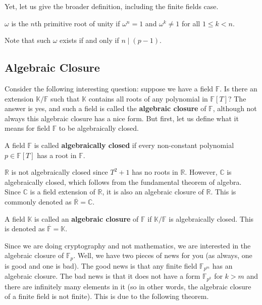 \documentclass[../../book.tex]{subfiles}
\begin{document}
Yet, let us give the broader definition, including the finite fields case.

\begin{definition}
    $\omega$ is the $n$th primitive root of unity if $\omega^n=1$ and $\omega^k \neq 1$ for all $1 \leq k < n$.
\end{definition}

Note that such $\omega$ exists if and only if $n \mid (p-1)$. 

\subsection{Algebraic Closure}

Consider the following interesting question: suppose we have a field $\mathbb{F}$. Is there an extension $\mathbb{K}/\mathbb{F}$ such that $\mathbb{K}$ contains all roots of any polynomial in $\mathbb{F}[T]$? The answer is yes, and such a field is called the \textbf{algebraic closure} of $\mathbb{F}$, although not always this algebraic closure has a nice form. But first, let us define what it means for field $\mathbb{F}$ to be algebraically closed.

\vspace{-0.75em}

\begin{definition}
    A field $\mathbb{F}$ is called \textbf{algebraically closed} if every non-constant polynomial $p \in \mathbb{F}[T]$ has a root in $\mathbb{F}$.
\end{definition}

\begin{example}
    $\mathbb{R}$ is not algebraically closed since $T^2+1$ has no roots in $\mathbb{R}$. However, $\mathbb{C}$ is algebraically closed, which follows from the fundamental theorem of algebra. Since $\mathbb{C}$ is a field extension of $\mathbb{R}$, it is also an algebraic closure of $\mathbb{R}$. This is commonly denoted as $\overline{\mathbb{R}} = \mathbb{C}$.
\end{example}

\begin{definition}
    A field $\mathbb{K}$ is called an \textbf{algebraic closure} of $\mathbb{F}$ if $\mathbb{K}/\mathbb{F}$ is algebraically closed. This is denoted as $\overline{\mathbb{F}} = \mathbb{K}$.
\end{definition}

Since we are doing cryptography and not mathematics, we are interested in the algebraic closure of $\mathbb{F}_p$. Well, we have two pieces of news for you (as always, one is good and one is bad). The good news is that any finite field $\mathbb{F}_{p^m}$ has an algebraic closure. The bad news is that it does not have a form $\mathbb{F}_{p^k}$ for $k>m$ and there are infinitely many elements in it (so in other words, the algebraic closure of a finite field is not finite). This is due to the following theorem.
\end{document}
